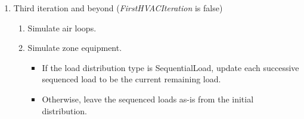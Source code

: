 \begin{enumerate}
\begin{enumerate}
\begin{itemize}
    \item
      Otherwise, leave the sequenced loads as-is from the initial distribution.
    \end{itemize}
  \end{enumerate}
\item
  Third iteration and beyond (\emph{FirstHVACIteration} is false)
  \begin{enumerate}
  \item
    Simulate air loops.
  \item
    Simulate zone equipment.
    \begin{itemize}
    \item
      If the load distribution type is SequentialLoad, update each successive sequenced load to be the current remaining load.
    \item
      Otherwise, leave the sequenced loads as-is from the initial distribution.
    \end{itemize}
  \end{enumerate}
\end{enumerate}
